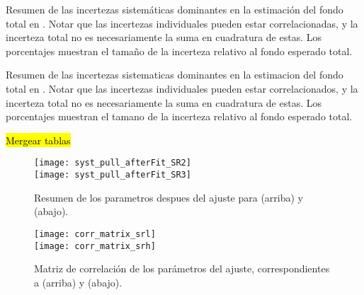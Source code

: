 

\begin{table}[!htbp]
  \centering

  \caption{Resumen de las incertezas sistemáticas dominantes en la estimación del fondo total
    en {\SRL}. Notar que las incertezas individuales pueden estar correlacionadas, y la incerteza
    total no es necesariamente la suma en cuadratura de estas. Los porcentajes muestran el tamaño
    de la incerteza relativo al fondo esperado total.}
  \label{tab:syst_srl}

  
\end{table}

\begin{table}[!htbp]
  \centering

  \caption{Resumen de las incertezas sistematicas dominantes en la estimacion del fondo total
    en {\SRH}. Notar que las incertezas individuales pueden estar correlacionados, y la incerteza
    total no es necesariamente la suma en cuadratura de estas. Los porcentajes muestran el tamano
    de la incerteza relativo al fondo esperado total.}
  \label{tab:syst_srh}

  

\end{table}

\hl{Mergear tablas}


\begin{figure}[!htbp]
  \centering

  \texttt{[image: syst\_pull\_afterFit\_SR2]} \\
  \texttt{[image: syst\_pull\_afterFit\_SR3]}

  \caption{Resumen de los parametros despues del ajuste para {\SRL} (arriba) y {\SRH} (abajo).}
  \label{fig:fit_unc_nuisance_SR}

\end{figure}

\begin{figure}[!htbp]
  \centering

  \texttt{[image: corr\_matrix\_srl]} \\
  \texttt{[image: corr\_matrix\_srh]} \\

  \caption{Matriz de correlación de los parámetros del ajuste, correspondientes a {\SRL} (arriba) y {\SRH} (abajo).}
  \label{fig:fit_corr_SR}

\end{figure}



